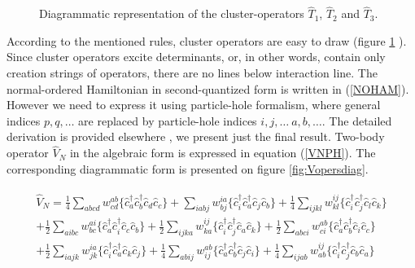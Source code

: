 \documentclass[twoside,english]{uiofysmaster}
\begin{document}
\begin{figure}[h!]
	\centering
	\bdiags
	\ediag
	\bdiags
	\ediag
	\bdiags
	\ediag
	\caption{Diagrammatic representation of the cluster-operators $\hat{T}_1$, $\hat{T}_2$ and $\hat{T}_3$.} \label{fig:Topersdiag}
\end{figure}

According to the mentioned rules, cluster operators are easy to draw (figure \ref{fig:Topersdiag} ). Since cluster operators excite determinants, or, in other words, contain only creation strings of operators, there are no lines below interaction line. The normal-ordered Hamiltonian in second-quantized form is written in (\ref{NOHAM}). However we need to express it using particle-hole formalism, where general indices $p,q,\dots$ are replaced by particle-hole indices $i,j,\dots \ a,b,\dots$. The detailed derivation is provided elsewhere \cite{S.KvaalLectureNotesFysKjm44802015}, we present just the final result. Two-body operator $\hat{V}_N$ in the algebraic form is expressed in equation (\ref{VNPH}). The corresponding diagrammatic form is presented on figure \ref{fig:Vopersdiag}.

\begin{align}\label{VNPH}
\begin{split}
	\hat{V}_N = \frac{1}{4}\sum_{abcd} w^{ab}_{cd} \{\hat{c}^\dagger_a\hat{c}^\dagger_b\hat{c}_d\hat{c}_c\} + \sum_{iabj} w^{ia}_{bj} \{\hat{c}^\dagger_i\hat{c}^\dagger_a\hat{c}_j\hat{c}_b\} + \frac{1}{4}\sum_{ijkl} w^{ij}_{kl} \{\hat{c}^\dagger_i\hat{c}^\dagger_j\hat{c}_l\hat{c}_k\} \\+ \frac{1}{2}\sum_{aibc} w^{ai}_{bc} \{\hat{c}^\dagger_a\hat{c}^\dagger_i\hat{c}_c\hat{c}_b\} + \frac{1}{2}\sum_{ijka} w^{ij}_{ka} \{\hat{c}^\dagger_i\hat{c}^\dagger_j\hat{c}_a\hat{c}_k\} + \frac{1}{2}\sum_{abci} w^{ab}_{ci} \{\hat{c}^\dagger_a\hat{c}^\dagger_b\hat{c}_i\hat{c}_c\} \\+ \frac{1}{2}\sum_{iajk} w^{ia}_{jk} \{\hat{c}^\dagger_i\hat{c}^\dagger_a\hat{c}_k\hat{c}_j\} + \frac{1}{4}\sum_{abij} w^{ab}_{ij} \{\hat{c}^\dagger_a\hat{c}^\dagger_b\hat{c}_j\hat{c}_i\} + \frac{1}{4}\sum_{ijab} w^{ij}_{ab} \{\hat{c}^\dagger_i\hat{c}^\dagger_j\hat{c}_b\hat{c}_a\}
\end{split}
\end{align}
\end{document}
